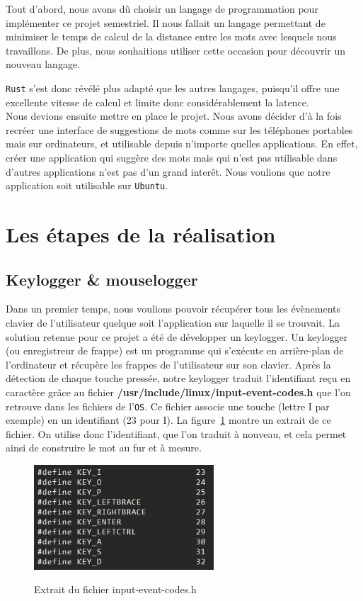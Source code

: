\documentclass[a4paper, 11pt]{report}
\newcommand{\langage}[1]{\texttt{#1}}
\begin{document}
Tout d'abord, nous avons dû choisir un langage de programmation pour implémenter ce projet semestriel. Il nous fallait un langage permettant de minimiser le temps de calcul de la distance entre les mots avec lesquels nous travaillons. De plus, nous souhaitions utiliser cette occasion pour découvrir un nouveau langage.~{\langage{Rust} s’est donc révélé plus adapté que les autres langages, puisqu’il offre une excellente vitesse de calcul et limite donc considérablement la latence.\\

Nous devions ensuite mettre en place le projet. Nous avons décider d'à la fois recréer une interface de suggestions de mots comme sur les téléphones portables mais sur ordinateurs, et utilisable depuis n'importe quelles applications. En effet, créer une application qui suggère des mots mais qui n'est pas utilisable dans d'autres applications n'est pas d'un grand interêt. Nous voulions que notre application soit utilisable sur \langage{Ubuntu}.

\section{Les étapes de la réalisation}

\subsection{Keylogger \& mouselogger}

Dans un premier temps, nous voulions pouvoir récupérer tous les évènements clavier de l'utilisateur quelque soit l'application sur laquelle il se trouvait. La solution retenue pour ce projet a été de développer un keylogger. Un keylogger (ou enregistreur de frappe) est un programme qui s’exécute en arrière-plan de l'ordinateur et récupère les frappes de l’utilisateur sur son clavier. Après la détection de chaque touche pressée, notre keylogger traduit l'identifiant reçu en caractère grâce au fichier \textbf{/usr/include/linux/input-event-codes.h} que l'on retrouve dans les fichiers de l'\langage{OS}. Ce fichier associe une touche (lettre I par exemple) en un identifiant (23 pour I). La figure~\ref{fig:lecture_touche} montre un extrait de ce fichier. On utilise donc l'identifiant, que l'on traduit à nouveau, et cela permet ainsi de construire le mot au fur et à mesure. \\

\begin{figure}[H]
	\begin{center}
		{\includegraphics[width=0.6\textwidth]{images/fichier_touche.png}}
	\end{center}
	\caption{Extrait du fichier input-event-codes.h}
	\label{fig:lecture_touche}
\end{figure}

}
\end{document}

